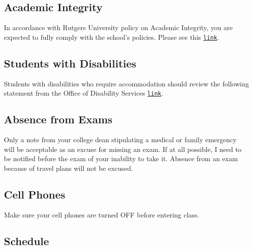 \documentclass[letterpaper]{article}
\begin{document}
\subsection*{Academic Integrity}
In accordance with Rutgers University policy on Academic Integrity, you are expected to fully comply with the school’s policies.  Please see this \href{http://academicintegrity.rutgers.edu}{\texttt{link}}.


\subsection*{Students with Disabilities}
Students with disabilities who require accommodation should review the following statement from the Office of Disability Services \href{https://ods.rutgers.edu/faculty/syllabus}{\texttt{link}}.


\subsection*{Absence from Exams}

Only a note from your college dean stipulating a medical or family emergency will be acceptable as an excuse for missing an exam. If at all possible, I need to be notified before the exam of your inability to take it. Absence from an exam because of travel plans will not be excused.

\subsection*{Cell Phones} 

Make sure your cell phones are turned OFF before entering class.


\subsection*{Schedule}
\end{document}
